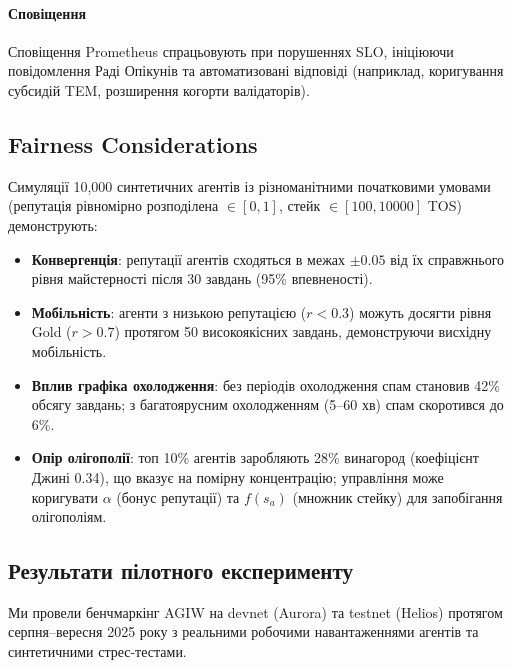 \documentclass[11pt]{article}
\begin{document}
\paragraph{Сповіщення} Сповіщення Prometheus спрацьовують при порушеннях SLO, ініціюючи повідомлення Раді Опікунів та автоматизовані відповіді (наприклад, коригування субсидій TEM, розширення когорти валідаторів).

\subsection{Fairness Considerations}
Симуляції 10,000 синтетичних агентів із різноманітними початковими умовами (репутація рівномірно розподілена $\in [0,1]$, стейк $\in [100, 10000]$ TOS) демонструють:
\begin{itemize}[noitemsep]
  \item \textbf{Конвергенція}: репутації агентів сходяться в межах $\pm0.05$ від їх справжнього рівня майстерності після 30 завдань (95\% впевненості).
  \item \textbf{Мобільність}: агенти з низькою репутацією ($r<0.3$) можуть досягти рівня Gold ($r>0.7$) протягом 50 високоякісних завдань, демонструючи висхідну мобільність.
  \item \textbf{Вплив графіка охолодження}: без періодів охолодження спам становив 42\% обсягу завдань; з багатоярусним охолодженням (5--60 хв) спам скоротився до 6\%.
  \item \textbf{Опір олігополії}: топ 10\% агентів заробляють 28\% винагород (коефіцієнт Джині 0.34), що вказує на помірну концентрацію; управління може коригувати $\alpha$ (бонус репутації) та $f(s_a)$ (множник стейку) для запобігання олігополіям.
\end{itemize}

\subsection{Результати пілотного експерименту}
\label{sec:pilot-results}
Ми провели бенчмаркінг AGIW на devnet (Aurora) та testnet (Helios) протягом серпня--вересня 2025 року з реальними робочими навантаженнями агентів та синтетичними стрес-тестами.
\end{document}
